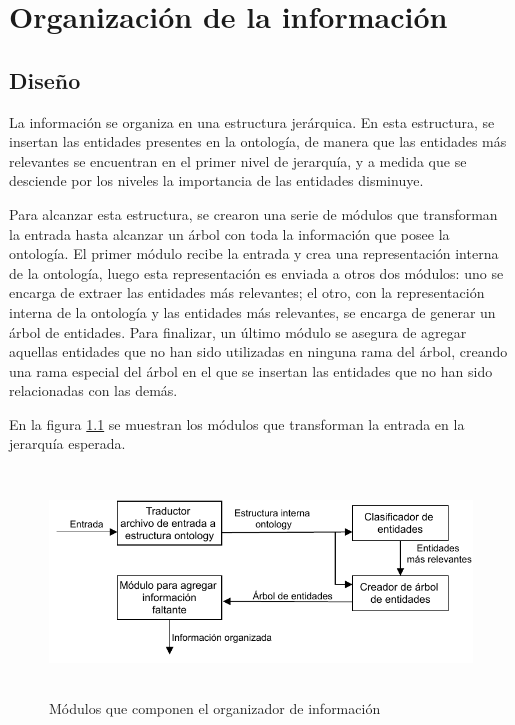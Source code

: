 \chapter{Organización de la información}

\section{Diseño}
La información se organiza en una estructura  jerárquica. En esta estructura, se insertan las entidades presentes en la ontología, de manera que las entidades más relevantes se encuentran en el primer nivel de jerarquía, y a medida que se desciende por los niveles la importancia de las entidades disminuye.

Para alcanzar esta estructura, se crearon una serie de módulos que transforman la entrada hasta alcanzar un árbol con toda la información que posee la ontología. El primer módulo recibe la entrada y crea una representación interna de la ontología, luego esta representación es enviada a otros dos módulos: uno se encarga de extraer las entidades más relevantes; el otro, con la representación interna de la ontología y las entidades más relevantes, se encarga de generar un árbol de entidades. Para finalizar, un último módulo se asegura de agregar aquellas entidades que no han sido utilizadas en ninguna rama del árbol, creando una rama especial del árbol en el que se insertan las entidades que no han sido relacionadas con las demás.

En la figura \ref{fig:modulos_organizador_inf} se muestran los módulos que transforman la entrada en la jerarquía esperada.

\begin{figure}[H]
    \centering
    \includegraphics[width=12cm, height=6cm]{img/organizacion_informacion/modulos_organizador_de_informacion.pdf}
    \caption{Módulos que componen el organizador de información}
    \label{fig:modulos_organizador_inf}
\end{figure}

